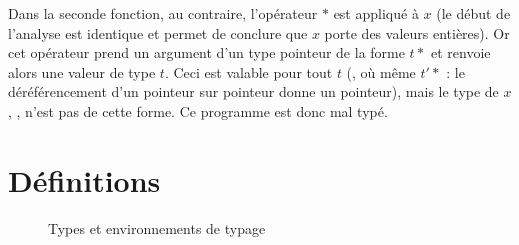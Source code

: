 Dans la seconde fonction, au contraire, l'opérateur $*$ est appliqué à $x$ (le
début de l'analyse est identique et permet de conclure que $x$ porte des valeurs
entières). Or cet opérateur prend un argument d'un type pointeur de la forme
$t*$ et renvoie alors une valeur de type $t$. Ceci est valable pour tout $t$
(\tInt, \tFloat où même $t'*$ : le déréférencement d'un pointeur sur pointeur
donne un pointeur), mais le type de $x$, \tInt, n'est pas de cette forme. Ce
programme est donc mal typé.

\section{Définitions}

\begin{figure}




  \caption{Types et environnements de typage}

  \label{fig:les-types}

\end{figure}

